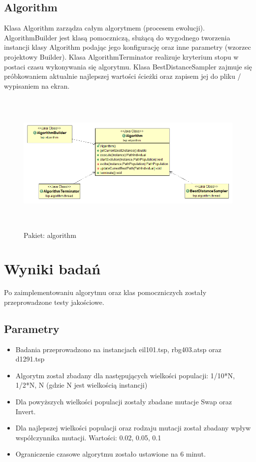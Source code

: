 \documentclass[a4paper,11pt]{article}
\begin{document}
\subsection{Algorithm}

Klasa Algorithm zarządza całym algorytmem (procesem ewolucji). AlgorithmBuilder jest klasą pomoczniczą, służącą do wygodnego tworzenia instancji klasy Algorithm podając jego konfigurację oraz inne parametry (wzorzec projektowy Builder). Klasa AlgorithmTerminator realizuje kryterium stopu w postaci czasu wykonywania się algorytmu. Klasa BestDistanceSampler zajmuje się próbkowaniem aktualnie najlepszej wartości ścieżki oraz zapisem jej do pliku / wypisaniem na ekran.

\begin{figure}[H]
\centering
\includegraphics[height=7cm]{algorithm.PNG}
\caption{Pakiet: algorithm}
\end{figure}

\newpage
\section{Wyniki badań}

Po zaimplementowaniu algorytmu oraz klas pomoczniczych zostały przeprowadzone testy jakościowe.

\subsection{Parametry}

\begin{itemize}
\item Badania przeprowadzono na instancjach eil101.tsp, rbg403.atsp oraz d1291.tsp
\item Algorytm został zbadany dla następujących wielkości populacji: 1/10*N, 1/2*N, N \newline (gdzie N jest wielkością instancji)
\item Dla powyższych wielkości populacji zostały zbadane mutacje Swap oraz Invert.
\item Dla najlepszej wielkości populacji oraz rodzaju mutacji został zbadany wpływ współczynnika mutacji. Wartości: 0.02, 0.05, 0.1
\item Ograniczenie czasowe algorytmu zostało ustawione na 6 minut.
\end{itemize}
\end{document}
